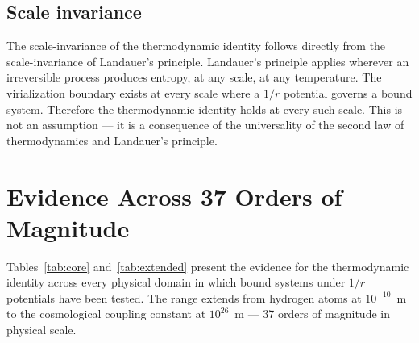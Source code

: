 \documentclass[12pt,a4paper]{article}
\begin{document}
\subsection{Scale invariance}

The scale-invariance of the thermodynamic identity follows directly from
the scale-invariance of Landauer's principle. Landauer's principle applies
wherever an irreversible process produces entropy, at any scale, at any
temperature. The virialization boundary exists at every scale where a $1/r$
potential governs a bound system. Therefore the thermodynamic identity
holds at every such scale. This is not an assumption --- it is a
consequence of the universality of the second law of thermodynamics and
Landauer's principle.

\section{Evidence Across 37 Orders of Magnitude}
\label{sec:evidence}

Tables~\ref{tab:core} and~\ref{tab:extended} present the evidence for the
thermodynamic identity across every physical domain in which bound systems
under $1/r$ potentials have been tested. The range extends from hydrogen
atoms at $10^{-10}$~m to the cosmological coupling constant at $10^{26}$~m
--- 37 orders of magnitude in physical scale.
\end{document}
